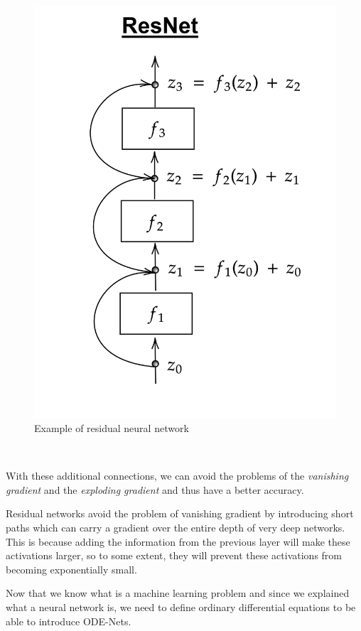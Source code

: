 \documentclass[10pt,a4paper]{article}
\theoremstyle{definition}
\theoremstyle{plain}
\begin{document}
\begin{figure}
\center
\includegraphics[scale=0.18]{resnet.png}
\caption{Example of residual neural network}
\label{exampleresnet}
\end{figure}

~

With these additional connections, we can avoid the problems of the \textit{vanishing gradient} and the \textit{exploding gradient} and thus have a better accuracy. 



Residual networks avoid the problem of vanishing gradient by introducing short paths which can carry a gradient over the entire depth of very deep networks. This is because adding the information from the previous layer will make these activations larger, so to some extent, they will prevent these activations from becoming exponentially small.

Now that we know what is a machine learning problem and since we explained what a neural network is, we need to define ordinary differential equations to be able to introduce ODE-Nets. 
\end{document}
